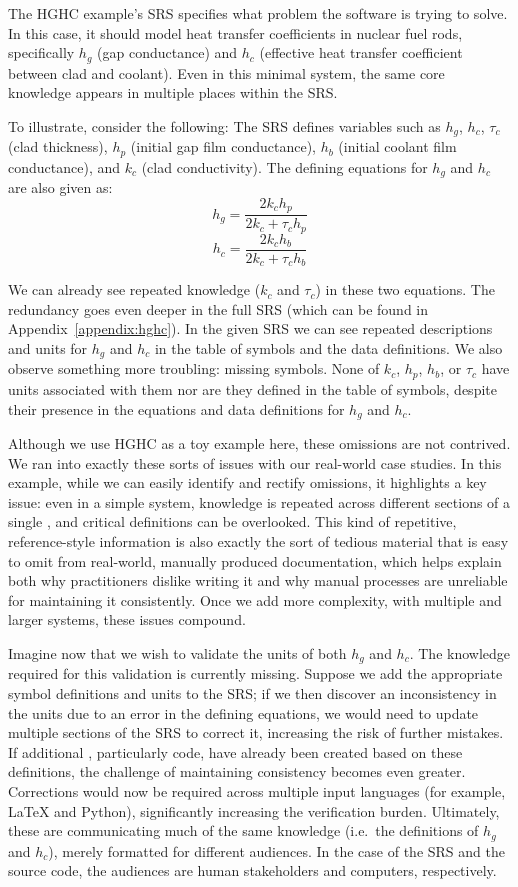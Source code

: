 The HGHC example's SRS specifies what problem the software is trying to solve.
In this case, it should model heat transfer coefficients in nuclear fuel rods, 
specifically $h_g$ (gap conductance) and $h_c$ (effective heat transfer 
coefficient between clad and coolant). Even in this minimal system, the same 
core knowledge appears in multiple places within the SRS.

To illustrate, consider the following: The SRS defines variables such as $h_g$, 
$h_c$, $\tau_c$ (clad thickness), $h_p$ (initial gap film conductance), $h_b$ 
(initial coolant film conductance), and $k_c$ (clad conductivity). The defining 
equations for $h_g$ and $h_c$ are also given as:
    \[
      h_g = \frac{2k_{c}h_{p}}{2k_{c}+\tau_c h_{p}}
    \]
    \[
      h_c = \frac{2k_{c}h_{b}}{2k_{c}+\tau_c h_{b}}
    \]

We can already see repeated knowledge ($k_c$ and $\tau_c$) in these two 
equations. The redundancy goes even deeper in the full SRS (which can be 
found in Appendix~\ref{appendix:hghc}). In the given SRS we can see repeated 
descriptions and units for $h_g$ and $h_c$ in the table of symbols and the data 
definitions. We also observe something more troubling: missing symbols. None of 
$k_c$, $h_p$, $h_b$, or $\tau_c$ have units associated with them nor are they 
defined in the table of symbols, despite their presence in the equations and 
data definitions for $h_g$ and $h_c$.

Although we use HGHC as a toy example here, these omissions are not contrived.
We ran into exactly these sorts of issues with our real-world case
studies. In this example, while we can easily identify and rectify omissions, 
it highlights a key issue: even in a simple system, knowledge is repeated 
across different sections of a single \sf{}, and critical definitions can be 
overlooked. This kind of repetitive, reference-style information is also 
exactly the sort of tedious material that is easy to omit from real-world, 
manually produced documentation, which helps explain both why practitioners 
dislike writing it and why manual processes are unreliable for maintaining it 
consistently. Once we add more complexity, with multiple \sfs{} and larger 
systems, these issues compound.

Imagine now that we wish to validate the units of both $h_g$ and $h_c$. The 
knowledge required for this validation is currently missing. Suppose we add the 
appropriate symbol definitions and units to the SRS; if we then discover an 
inconsistency in the units due to an error in the defining equations, we would 
need to update multiple sections of the SRS to correct it, increasing the risk 
of further mistakes. If additional \sfs{}, particularly code, have already been 
created based on these definitions, the challenge of maintaining consistency 
becomes even greater. Corrections would now be required across multiple input 
languages (for example, \LaTeX{} and Python), significantly increasing the 
verification burden. Ultimately, these \sfs{} are communicating much of the 
same knowledge (i.e.\ the definitions of $h_g$ and $h_c$), merely formatted for 
different audiences. In the case of the SRS and the source code, the audiences 
are human stakeholders and computers, respectively.

